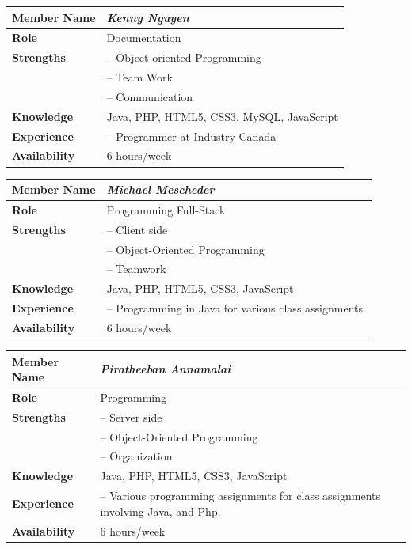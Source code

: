 \documentclass[12pt]{article}
\begin{document}
%
\vspace{3mm}
%
\begin{center}
\begin{tabular}{ p{2.7cm} | p{9cm} }
\hline
\textbf{Member Name}	&	\textit{\textbf{Kenny Nguyen}}	\\ \hline \hline
\textbf{Role}		&	Documentation	\\ \hline
\textbf{Strengths}	&	-- Object-oriented Programming	\\
					&	-- Team Work	\\
					&	-- Communication	\\ \hline
\textbf{Knowledge}	&	Java, PHP, HTML5, CSS3, MySQL, JavaScript 	\\ \hline
\textbf{Experience}	&	-- Programmer at Industry Canada	\\ \hline
\textbf{Availability}	&	6 hours/week	\\ \hline
\end{tabular}
\end{center}
%
\vspace{3mm}
%
\begin{center}
\begin{tabular}{ p{2.7cm} | p{9cm} }
\hline
\textbf{Member Name}	&	\textit{\textbf{Michael Mescheder}}	\\ \hline \hline
\textbf{Role}		&	Programming Full-Stack	\\ \hline
\textbf{Strengths}	&	-- Client side	\\
					&	-- Object-Oriented Programming	\\
					&	-- Teamwork	\\ \hline
\textbf{Knowledge}	&	Java, PHP, HTML5, CSS3, JavaScript	\\ \hline
\textbf{Experience}	&	-- Programming in Java for various class assignments.	\\ \hline
\textbf{Availability}	&	6 hours/week	\\ \hline
\end{tabular}
\end{center}
%
\vspace{3mm}
%
\begin{center}
\begin{tabular}{ p{2.7cm} | p{9cm} }
\hline
\textbf{Member Name}	&	\textit{\textbf{Piratheeban Annamalai}}	\\ \hline \hline
\textbf{Role}		&	Programming	\\ \hline
\textbf{Strengths}	&	-- Server side	\\
					&	-- Object-Oriented Programming	\\
					&	-- Organization	\\ \hline
\textbf{Knowledge}	&	Java, PHP, HTML5, CSS3, JavaScript	\\ \hline
\textbf{Experience}	&	-- Various programming assignments for class assignments involving Java, and Php.	\\ \hline
\textbf{Availability}	&	6 hours/week	\\ \hline
\end{tabular}
\end{center}
\end{document}
